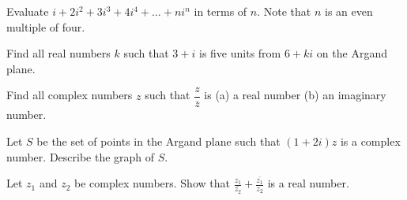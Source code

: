 \documentclass[lang=en,11pt]{elegantbook}
\begin{document}
\begin{reviewset}
\item Evaluate $i+2i^2+3i^3+4i^4+\ldots+ni^n$ in terms of $n$.  Note that $n$ is an even multiple of four.\vspace{3mm}

\item Find all real numbers $k$ such that $3+i$ is five units from $6+ki$ on the Argand plane.\vspace{3mm}

\item Find all complex numbers $z$ such that $\dfrac{z}{\overline{z}}$ is \newline 
{\centering (a) a real number \hspace{55mm} (b) an imaginary number.}
\item Let $S$ be the set of points in the Argand plane such that $(1+2i)z$ is a complex number.  Describe the graph of $S$.  \vspace{3mm}

\item Let $z_1$ and $z_2$ be complex numbers.  Show that $\displaystyle \frac{z_1}{\overline{z_2}}+\frac{\overline{z_1}}{z_2}$ is a real number.  \vspace{3mm}
\end{reviewset}
\end{document}

